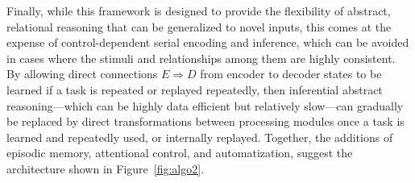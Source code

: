 Finally, while this framework is designed to provide the flexibility of abstract, relational reasoning that can be generalized to novel inputs, this comes at the expense of control-dependent serial encoding and inference, which can be avoided in cases where the stimuli and relationships among them are highly consistent. By allowing
direct connections $E \Rightarrow D$ from encoder to decoder states to be learned if a task is repeated or replayed repeatedly, then inferential abstract reasoning---which can be highly data efficient but relatively slow---can gradually be replaced by direct transformations between processing modules once a task is learned and repeatedly used, or internally replayed.  Together, the additions of episodic memory, attentional control, and automatization, 
suggest the architecture shown in Figure~\ref{fig:algo2}.


